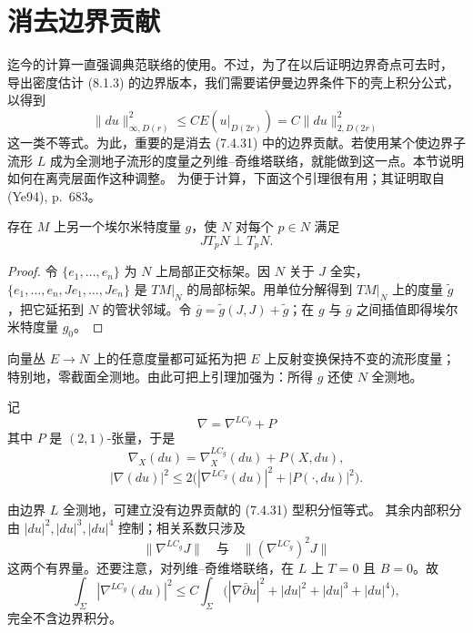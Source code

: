 \section{消去边界贡献}
\label{sec:removing-boundary-contributions}

迄今的计算一直强调典范联络的使用。不过，为了在以后证明边界奇点可去时，
导出密度估计 (8.1.3) 的边界版本，我们需要诺伊曼边界条件下的壳上积分公式，
以得到
\begin{equation}
 \|du\|_{\infty,D(r)}^2\leq CE(u|_{D(2r)})=C\|du\|_{2,D(2r)}^2
 \label{eq:ch8-boundary-density-target}
\end{equation}
这一类不等式。为此，重要的是消去 (7.4.31) 中的边界贡献。若使用某个使边界子流形
$L$ 成为全测地子流形的度量之列维--奇维塔联络，就能做到这一点。本节说明如何在离壳层面作这种调整。
为便于计算，下面这个引理很有用；其证明取自 (Ye94), p.~683。

\begin{lemma}\label{lem:ch8-hermitian-metric-totally-real-orthogonal}
存在 $M$ 上另一个埃尔米特度量 $g$，使 $N$ 对每个 $p\in N$ 满足
\begin{equation}
 JT_pN\perp T_pN.
 \label{eq:ch8-totally-real-orthogonal}
\end{equation}
\end{lemma}
\begin{proof}
令 $\{e_1,\ldots,e_n\}$ 为 $N$ 上局部正交标架。因 $N$ 关于 $J$ 全实，
$\{e_1,\ldots,e_n,Je_1,\ldots,Je_n\}$ 是 $TM|_N$ 的局部标架。用单位分解得到
$TM|_N$ 上的度量 $\widetilde g$，把它延拓到 $N$ 的管状邻域。令
$\overline g=\widetilde g(J,J)+\widetilde g$；在 $g$ 与 $\overline g$ 之间插值即得埃尔米特度量 $g_0$。
\end{proof}

\begin{remark}\label{rem:ch8-totally-geodesic-metric}
向量丛 $E\to N$ 上的任意度量都可延拓为把 $E$ 上反射变换保持不变的流形度量；特别地，零截面全测地。由此可把上引理加强为：所得 $g$ 还使 $N$ 全测地。
\end{remark}

记
\[
 \nabla=\nabla^{LC_g}+P
\]
其中 $P$ 是 $(2,1)$-张量，于是
\[
 \nabla_X(du)=\nabla_X^{LC_g}(du)+P(X,du),
\]
\begin{equation}
 |\nabla(du)|^2\leq2\bigl(|\nabla^{LC_g}(du)|^2+|P(\cdot,du)|^2\bigr).
 \label{eq:ch8-canonical-vs-levi-civita}
\end{equation}
\begin{sloppypar}
由边界 $L$ 全测地，可建立没有边界贡献的 (7.4.31) 型积分恒等式。
其余内部积分由 $|du|^2,|du|^3,|du|^4$ 控制；相关系数只涉及
\[
 \|\nabla^{LC_g}J\|\quad\text{与}\quad\|(\nabla^{LC_g})^2J\|
\]
这两个有界量。还要注意，对列维--奇维塔联络，在 $L$ 上 $T=0$ 且 $B=0$。故
\[
 \int_\Sigma|\nabla^{LC_g}(du)|^2\leq C\int_\Sigma
 \bigl(|\nabla\bar\partial u|^2+|du|^2+|du|^3+|du|^4\bigr),
\]
完全不含边界积分。
\end{sloppypar}

